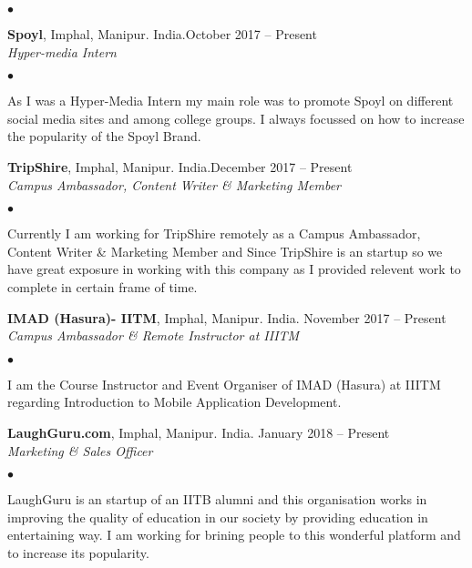 \documentclass[margin,line]{res}
\newenvironment{list2}{
  \begin{list}{$\bullet$}{%
      \setlength{\itemsep}{0in}
      \setlength{\parsep}{0in} \setlength{\parskip}{0in}
      \setlength{\topsep}{0in} \setlength{\partopsep}{0in}
      \setlength{\leftmargin}{0.2in}}}{\end{list}}
\begin{document}
\begin{resume}
\begin{list2}
\end{list2}
{\bf Spoyl}, Imphal, Manipur. India.\hfill {October 2017 -- Present}\\
{\em Hyper-media Intern}\\
\begin{list2} %
\item As I was a Hyper-Media Intern my main role was to promote Spoyl on different social media sites and among college groups. I always focussed on how to increase the popularity of the Spoyl Brand. \\

\end{list2}
{\bf TripShire}, Imphal, Manipur. India.\hfill {December 2017 -- Present}\\
{\em Campus Ambassador, Content Writer 
\& Marketing Member}\\
\begin{list2} %
\item  Currently I am working for TripShire remotely as a Campus Ambassador, Content Writer 
\& Marketing Member and Since TripShire is an startup so we have great exposure in working with this company as I provided relevent work to complete in certain frame of time. \\
\end{list2}
{\bf IMAD (Hasura)- IITM}, Imphal, Manipur. India. \hfill{November 2017 -- Present}\\
{\em Campus Ambassador \& Remote Instructor at IIITM}
\begin{list2} %
\item I am the Course Instructor and Event Organiser of IMAD (Hasura) at IIITM regarding Introduction to Mobile Application Development. \\

\end{list2}
{\bf  LaughGuru.com}, Imphal, Manipur. India. \hfill{January 2018 -- Present}\\
{\em Marketing \& Sales Officer}
\begin{list2} %
\item LaughGuru is an startup of an IITB alumni and this organisation works in improving the quality of education in our society by providing education in entertaining way. I am working for brining people to this wonderful platform and to increase its popularity. \\

\end{list2}



\end{resume}
\end{document}
